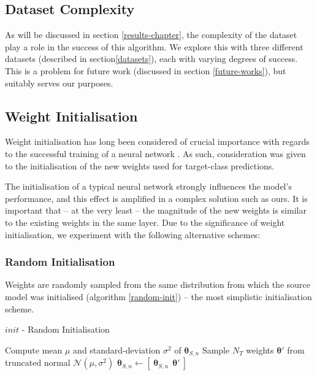 \documentclass{report}
\begin{document}
\subsection{Dataset Complexity}
As will be discussed in section \ref{results-chapter}, the complexity of the dataset play a role in the success of this algorithm. We explore this with three different datasets (described in section\ref{datasets}), each with varying degrees of success. This is a problem for future work (discussed in section \ref{future-works}), but suitably serves our purposes. \par

\subsection{Weight Initialisation}
Weight initialisation has long been considered of crucial importance with regards to the successful training of a neural network \parencite{heinit}\parencite{weightinit}. As such, consideration was given to the initialisation of the new weights used for target-class predictions. \par
The initialisation of a typical neural network strongly influences the model's performance, and this effect is amplified in a complex solution such as ours. It is important that -- at the very least -- the magnitude of the new weights is similar to the existing weights in the same layer. Due to the significance of weight initialisation, we experiment with the following alternative schemes:

\subsubsection{Random Initialisation}
Weights are randomly sampled from the same distribution from which the source model was initialised (algorithm \ref{random-init}) -- the most simplistic initialisation scheme.
\begin{algorithm}[h!]
	\label{alg:random-init}
	\caption{$init$ - Random Initialisation }
	\label{random-init}
	\begin{algorithmic}[1]
		\State Compute mean $\mu$ and standard-deviation $\sigma^2$ of $\bm{\theta}_{S,n}$
		\State Sample $N_T$ weights $\bm{\theta}'$ from truncated normal $\mathcal{N}(\mu, \sigma^2)$
		\State $\bm{\theta}_{S,n} \gets [~ \bm{\theta}_{S,n}~ ~ \bm{\theta}'~ ]$
	\end{algorithmic}
\end{algorithm}
\end{document}
